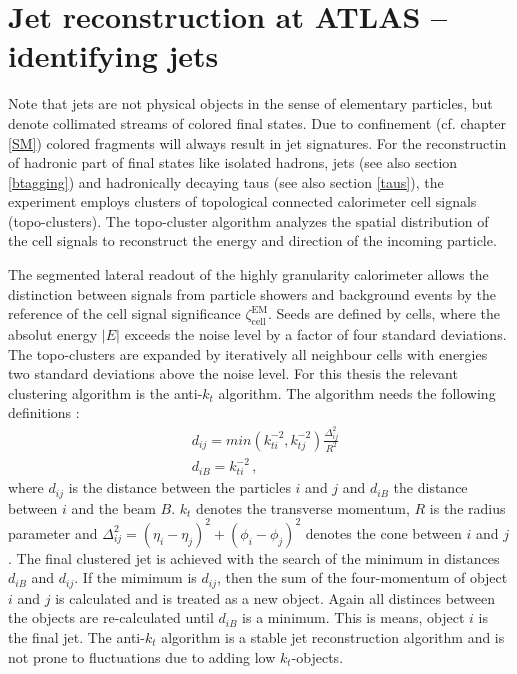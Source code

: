 \section{Jet reconstruction at ATLAS -- identifying jets}\label{jets}
Note that jets are not physical objects in the sense of elementary particles, but denote collimated streams of colored final states. Due to confinement (cf. chapter \ref{SM}) colored fragments will always result in jet signatures. \cite{PhysTeV}\newline  
For the reconstructin of hadronic part of final states like isolated hadrons, jets (see also section \ref{btagging}) and hadronically decaying taus (see also section \ref{taus}), the {\ATLAS} experiment employs clusters of topological connected calorimeter cell signals (topo-clusters). The topo-cluster algorithm analyzes the spatial distribution of the cell signals to reconstruct the energy and direction of the incoming particle. \cite{topo}\par
The segmented lateral readout of the highly granularity calorimeter allows the distinction between signals from particle showers and background events by the reference of the cell signal significance $\zeta_\text{cell}^\text{EM}$. \cite{topo} Seeds are defined by cells, where the absolut energy $|E|$ exceeds the noise level by a factor of four standard deviations. The topo-clusters are expanded by iteratively all neighbour cells with energies two standard deviations above the noise level. \cite{jetPerformance}\newline
For this thesis the relevant clustering algorithm is the anti-$k_t$ algorithm. The algorithm needs the following definitions \cite{antikt}:
\begin{align}
                        &d_{ij}=min(k_{ti}^{-2},k_{tj}^{-2})\frac{\Delta_{ij}^2}{R^2}\\
                        &d_{iB}=k_{ti}^{-2}\,\text{,}
\label{antiktalgorithm}
\end{align}
where $d_{ij}$ is the distance between the particles $i$ and $j$ and $d_{iB}$ the distance between $i$ and the beam $B$. $k_t$ denotes the transverse momentum, $R$ is the radius parameter and $\Delta_{ij}^2=(\eta_i-\eta_j)^2+(\phi_i-\phi_j)^2$ denotes the cone between $i$ and $j$. The final clustered jet is achieved with the search of the minimum in distances $d_{iB}$ and $d_{ij}$. If the mimimum is $d_{ij}$, then the sum of the four-momentum of object $i$ and $j$ is calculated and is treated as a new object. Again all distinces between the objects are re-calculated until $d_{iB}$ is a minimum. This is means, object $i$ is the final jet. The anti-$k_t$ algorithm is a stable jet reconstruction algorithm and is not prone to fluctuations due to adding low $k_t$-objects. \cite{antikt}
%
%
